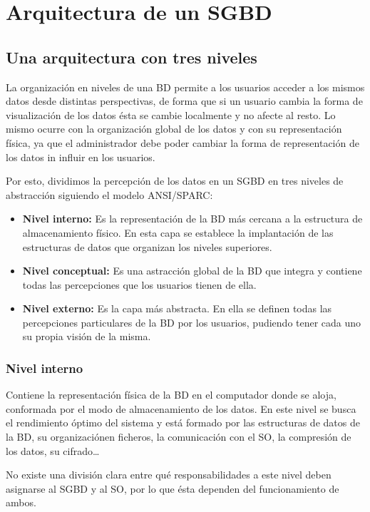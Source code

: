 \chapter{Arquitectura de un SGBD}

\section{Una arquitectura con tres niveles}

La organización en niveles de una BD permite a los usuarios acceder a los mismos datos desde distintas perspectivas, de forma que si un usuario cambia la forma de visualización de los datos ésta se cambie localmente y no afecte al resto.
Lo mismo ocurre con la organización global de los datos y con su representación física, ya que el administrador debe poder cambiar la forma de representación de los datos in influir en los usuarios.

Por esto, dividimos la percepción de los datos en un SGBD en tres niveles de abstracción siguiendo el modelo ANSI/SPARC\@:

\begin{itemize}
	\item\textbf{Nivel interno:} Es la representación de la BD más cercana a la estructura de almacenamiento físico. En esta capa se establece la implantación de las estructuras de datos que organizan los niveles superiores.
	\item\textbf{Nivel conceptual:} Es una astracción global de la BD que integra y contiene todas las percepciones que los usuarios tienen de ella.
	\item\textbf{Nivel externo:} Es la capa más abstracta. En ella se definen todas las percepciones particulares de la BD por los usuarios, pudiendo tener cada uno su propia visión de la misma.
\end{itemize}

\subsection{Nivel interno}

Contiene la representación física de la BD en el computador donde se aloja, conformada por el modo de almacenamiento de los datos.
En este nivel se busca el rendimiento óptimo del sistema y está formado por las estructuras de datos de la BD, su organizaciónen ficheros, la comunicación con el SO, la compresión de los datos, su cifrado\ldots

No existe una división clara entre qué responsabilidades a este nivel deben asignarse al SGBD y al SO, por lo que ésta dependen del funcionamiento de ambos.

